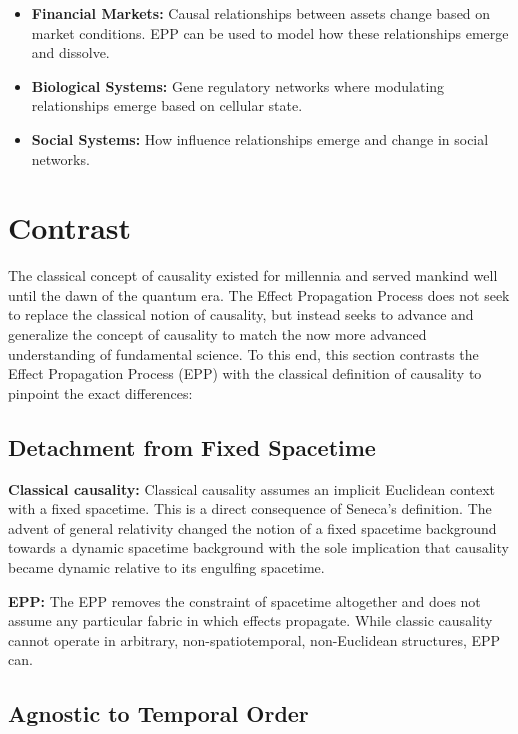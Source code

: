 \documentclass{article}
\begin{document}
\begin{itemize}
    \item \textbf{Financial Markets:}  Causal relationships between assets change based on market conditions. EPP can be used to model how these relationships emerge and dissolve.
    \item \textbf{Biological Systems:} Gene regulatory networks where modulating relationships emerge based on cellular state.
    \item \textbf{Social Systems:} How influence relationships emerge and change in social networks.
\end{itemize}

\section{Contrast}
\label{sec:contrast}

The classical concept of causality existed for millennia and served mankind well until the dawn of the quantum era. The Effect Propagation Process does not seek to replace the classical notion of causality, but instead seeks to advance and generalize the concept of causality to match the now more advanced understanding of fundamental science. To this end, this section contrasts the Effect Propagation Process (EPP) with the classical definition of causality to pinpoint the exact differences:

\subsection{Detachment from Fixed Spacetime}

\textbf{Classical causality:} 
Classical causality assumes an implicit Euclidean context with a fixed spacetime. This is a direct consequence of Seneca’s definition. The advent of general relativity changed the notion of a fixed spacetime background towards a dynamic spacetime background with the sole implication that causality became dynamic relative to its engulfing spacetime.

\textbf{EPP:} 
The EPP removes the constraint of spacetime altogether and does not assume any particular fabric in which effects propagate. While classic causality cannot operate in arbitrary, non-spatiotemporal, non-Euclidean structures, EPP  can.


\subsection{Agnostic to Temporal Order}
\end{document}
